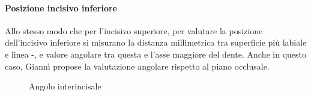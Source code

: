 \paragraph{Posizione incisivo inferiore}
Allo stesso modo che per l'incisivo superiore, per valutare la posizione dell'incisivo inferiore si misurano la distanza millimetrica tra superficie più labiale e linea -, e valore angolare tra questa e l'asse maggiore del dente. Anche in questo caso, Giannì propose la valutazione angolare rispetto al piano occlusale.

\begin{figure}[!p]
\centering
\begin{minipage}{.44\textwidth}
 \centering
 \caption{Angolo interincisale}
 \label{fig:steiner_interincisale}
\end{minipage}\quad\quad
\begin{minipage}{.44\textwidth}
 \centering

\end{minipage}
\end{figure}
